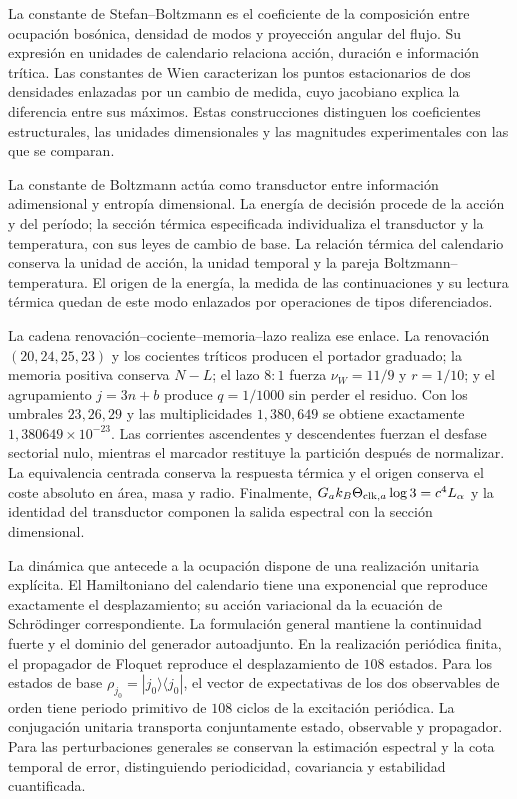 La constante de Stefan--Boltzmann es el coeficiente de la composición
entre ocupación bosónica, densidad de modos y proyección angular del
flujo. Su expresión en unidades de calendario relaciona acción,
duración e información trítica. Las constantes de Wien caracterizan
los puntos estacionarios de dos densidades enlazadas por un cambio de
medida, cuyo jacobiano explica la diferencia entre sus máximos.
Estas construcciones distinguen los coeficientes estructurales, las
unidades dimensionales y las magnitudes experimentales con las que
se comparan.

La constante de Boltzmann actúa como transductor entre información
adimensional y entropía dimensional. La energía de decisión procede
de la acción y del período; la sección térmica especificada
individualiza el transductor y la temperatura, con sus leyes de cambio
de base. La relación térmica del calendario conserva la unidad de
acción, la unidad temporal y la pareja Boltzmann--temperatura.
El origen de la energía, la medida de las continuaciones y su lectura
térmica quedan de este modo enlazados por operaciones de tipos
diferenciados.

La cadena renovación--cociente--memoria--lazo realiza ese enlace. La renovación
$(20,24,25,23)$ y los cocientes tríticos producen el portador graduado;
la memoria positiva conserva $N-L$; el lazo $8{:}1$ fuerza
$\nu_W=11/9$ y $r=1/10$; y el agrupamiento $j=3n+b$ produce
$q=1/1000$ sin perder el residuo. Con los umbrales $23,26,29$ y las
multiplicidades $1,380,649$ se obtiene exactamente
$1{,}380649\times10^{-23}$. Las corrientes ascendentes y descendentes
fuerzan el desfase sectorial nulo, mientras el marcador restituye la
partición después de normalizar. La equivalencia centrada conserva la
respuesta térmica y el origen conserva el coste absoluto en área, masa y
radio. Finalmente,
$G_a k_B\Theta_{{\rm clk},a}\log3=c^4L_\alpha$ y la identidad del
transductor componen la salida espectral con la sección dimensional.

La dinámica que antecede a la ocupación dispone de una realización
unitaria explícita. El Hamiltoniano del calendario tiene una exponencial
que reproduce exactamente el desplazamiento; su acción variacional da
la ecuación de Schrödinger correspondiente. La formulación general
mantiene la continuidad fuerte y el dominio del generador autoadjunto.
En la realización periódica finita, el propagador de Floquet reproduce
el desplazamiento de \(108\) estados. Para los estados de base
\(\rho_{j_0}=|j_0\rangle\langle j_0|\), el vector de expectativas de
los dos observables de orden tiene periodo primitivo de \(108\) ciclos
de la excitación periódica.
La conjugación unitaria transporta
conjuntamente estado, observable y propagador. Para las perturbaciones
generales se conservan la estimación espectral y la cota temporal de
error, distinguiendo periodicidad, covariancia y estabilidad cuantificada.

